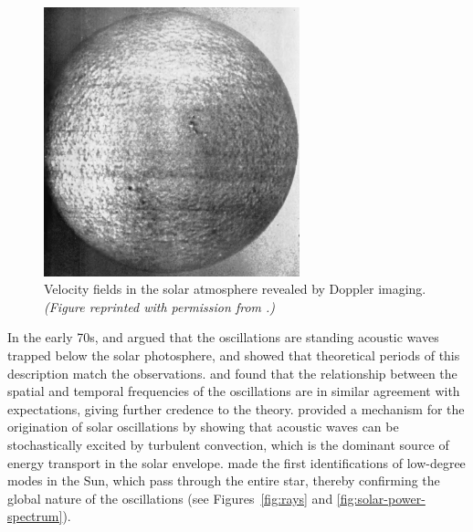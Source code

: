 \begin{figure}[t!]%
    \centering
    \includegraphics[width=0.66\textwidth,%
        trim={0 1.5mm 0 1.5mm}, clip]{pics/solar-velocity-fields2.png}
    \caption[Velocity fields in the solar atmosphere]{Velocity fields in the solar atmosphere revealed by Doppler imaging. %
    \emph{(Figure reprinted with permission from \citealt{1962ApJ...135..474L}.)}
    \label{fig:solar-velocity-fields}}
\end{figure}


In the early 70s, \citet{1970ApJ...162..993U} and \citet{1971ApL.....7..191L} argued that the oscillations are standing acoustic waves trapped below the solar photosphere, and showed that theoretical periods of this description match the observations. 
\citet{1975A&A....44..371D} and \citet{1977ApJ...218..901R} found that the relationship between the spatial and temporal frequencies of the oscillations are in similar agreement with expectations, giving further credence to the theory. 
\citet{1977ApJ...212..243G} provided a mechanism for the origination of solar oscillations by showing that acoustic waves can be stochastically excited by turbulent convection, which is the dominant source of energy transport in the solar envelope. 
\citet{1979Natur.282..591C} made the first identifications of low-degree modes in the Sun, which pass through the entire star, thereby confirming the global nature of the oscillations (see Figures~\ref{fig:rays} and \ref{fig:solar-power-spectrum}). 



